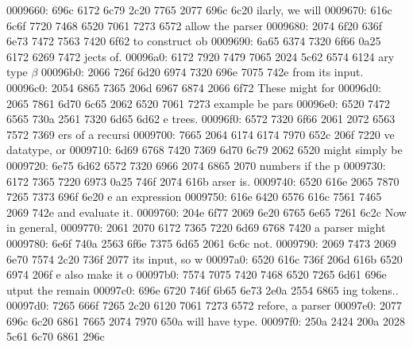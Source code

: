 \begin{bo
00010e0: 7865 647d 5c62 6567 696e 7b76 6572 6261  xed}
\begin{verba
00010f0: 7469 6d7d 0a20 2023 7479 7065 2074 6572  tim}
\begin{
0001c40: 7665 7262 6174 696d 7d0a 2020 236c 6574  verbatim}
\begin{boxe
00027a0: 647d 5c62 6567 696e 7b76 6572 6261 7469  d}
\begin{verbati
00027b0: 6d7d 0a20 2023 6c65 7420 696e 6669 7865  m}
\begin{v
0002c60: 6572 6261 7469 6d7d 0a20 2023 6c65 7420  erbatim}
\begin{
0002dc0: 7665 7262 6174 696d 7d0a 2020 236c 6574  verbatim}
\begin{boxed
0002f30: 7d5c 6265 6769 6e7b 7665 7262 6174 696d  }
\begin{verbatim
0002f40: 7d0a 2020 236c 6574 2068 6428 683a 3a74  }
\begin{v
0003e60: 6572 6261 7469 6d7d 0a20 2023 236f 7065  erbatim}
\begin{boxed
00042b0: 7d5c 6265 6769 6e7b 7665 7262 6174 696d  }
\begin{verbatim
00042c0: 7d0a 2020 2328 782c 7429 3b3b 0a20 202d  }
\begin{boxed}
0009660: 696c 6172 6c79 2c20 7765 2077 696c 6c20  ilarly, we will 
0009670: 616c 6c6f 7720 7468 6520 7061 7273 6572  allow the parser
0009680: 2074 6f20 636f 6e73 7472 7563 7420 6f62   to construct ob
0009690: 6a65 6374 7320 6f66 0a25 6172 6269 7472  jects of.%
00096a0: 6172 7920 7479 7065 2024 5c62 6574 6124  ary type $\beta$
00096b0: 2066 726f 6d20 6974 7320 696e 7075 742e   from its input.
00096c0: 2054 6865 7365 206d 6967 6874 2066 6f72   These might for
00096d0: 2065 7861 6d70 6c65 2062 6520 7061 7273   example be pars
00096e0: 6520 7472 6565 730a 2561 7320 6d65 6d62  e trees.%
00096f0: 6572 7320 6f66 2061 2072 6563 7572 7369  ers of a recursi
0009700: 7665 2064 6174 6174 7970 652c 206f 7220  ve datatype, or 
0009710: 6d69 6768 7420 7369 6d70 6c79 2062 6520  might simply be 
0009720: 6e75 6d62 6572 7320 6966 2074 6865 2070  numbers if the p
0009730: 6172 7365 7220 6973 0a25 746f 2074 616b  arser is.%
0009740: 6520 616e 2065 7870 7265 7373 696f 6e20  e an expression 
0009750: 616e 6420 6576 616c 7561 7465 2069 742e  and evaluate it.
0009760: 204e 6f77 2069 6e20 6765 6e65 7261 6c2c   Now in general,
0009770: 2061 2070 6172 7365 7220 6d69 6768 7420   a parser might 
0009780: 6e6f 740a 2563 6f6e 7375 6d65 2061 6c6c  not.%
0009790: 2069 7473 2069 6e70 7574 2c20 736f 2077   its input, so w
00097a0: 6520 616c 736f 206d 616b 6520 6974 206f  e also make it o
00097b0: 7574 7075 7420 7468 6520 7265 6d61 696e  utput the remain
00097c0: 696e 6720 746f 6b65 6e73 2e0a 2554 6865  ing tokens..%
00097d0: 7265 666f 7265 2c20 6120 7061 7273 6572  refore, a parser
00097e0: 2077 696c 6c20 6861 7665 2074 7970 650a   will have type.
00097f0: 250a 2424 200a 2028 5c61 6c70 6861 296c  %

\end{boxed}
\end{verbatim
00042c0: 7d0a 2020 2328 782c 7429 3b3b 0a20 202d  }
\end{boxed
00042b0: 7d5c 6265 6769 6e7b 7665 7262 6174 696d  }
\end{v
0003e60: 6572 6261 7469 6d7d 0a20 2023 236f 7065  erbatim}
\end{verbatim
0002f40: 7d0a 2020 236c 6574 2068 6428 683a 3a74  }
\end{boxed
0002f30: 7d5c 6265 6769 6e7b 7665 7262 6174 696d  }
\end{
0002dc0: 7665 7262 6174 696d 7d0a 2020 236c 6574  verbatim}
\end{v
0002c60: 6572 6261 7469 6d7d 0a20 2023 6c65 7420  erbatim}
\end{verbati
00027b0: 6d7d 0a20 2023 6c65 7420 696e 6669 7865  m}
\end{boxe
00027a0: 647d 5c62 6567 696e 7b76 6572 6261 7469  d}
\end{
0001c40: 7665 7262 6174 696d 7d0a 2020 236c 6574  verbatim}
\end{verba
00010f0: 7469 6d7d 0a20 2023 7479 7065 2074 6572  tim}
\end{bo
00010e0: 7865 647d 5c62 6567 696e 7b76 6572 6261  xed}
